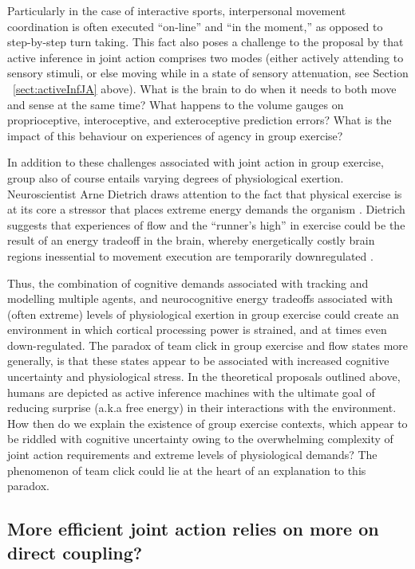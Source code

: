 \begin{CJK}{UTF8}{gbsn}
Particularly in the case of interactive sports, interpersonal movement coordination is often executed ``on-line'' and ``in the moment,'' as opposed to step-by-step turn taking.  This fact also poses a challenge to the proposal by \textcite{Friston2015} that active inference in joint action comprises two modes (either actively attending to sensory stimuli, or else moving while in a state of sensory attenuation, see Section ~\ref{sect:activeInfJA} above). What is the brain to do when it needs to both move and sense at the same time?  What happens to the volume gauges on proprioceptive, interoceptive, and exteroceptive prediction errors?  What is the impact of this behaviour on experiences of agency in group exercise?

In addition to these challenges associated with joint action in group exercise, group also of course entails varying degrees of physiological exertion.  Neuroscientist Arne Dietrich draws attention to the fact that physical exercise is at its core a stressor that places extreme energy demands the organism \citep{Dietrich2011}.  Dietrich suggests that experiences of flow and the ``runner's high'' in exercise could be the result of an energy tradeoff in the brain, whereby energetically costly brain regions inessential to movement execution are temporarily downregulated \citep{Dietrich2004b}.

Thus, the combination of cognitive demands associated with tracking and modelling multiple agents, and neurocognitive energy tradeoffs associated with (often extreme) levels of physiological exertion in group exercise could create an environment in which cortical processing power is strained, and at times even down-regulated.  The paradox of team click in group exercise and flow states more generally, is that these states appear to be associated with increased cognitive uncertainty and physiological stress.  In the theoretical proposals outlined above, humans are depicted as active inference machines with the ultimate goal of reducing surprise (a.k.a free energy) in their interactions with the environment. How then do we explain the existence of group exercise contexts, which appear to be riddled with cognitive uncertainty owing to the overwhelming complexity of joint action requirements and extreme levels of physiological demands?  The phenomenon of team click could lie at the heart of an explanation to this paradox.


\subsection{More efficient joint action relies on more on direct coupling?}


\end{CJK}

